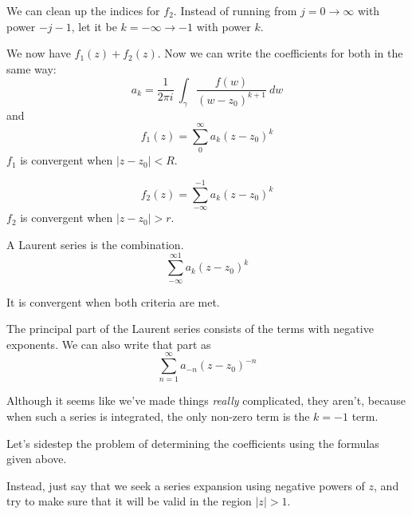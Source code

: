\documentclass[11pt, oneside]{article}
\begin{document}
We can clean up the indices for $f_2$.  Instead of running from $j = 0 \rightarrow \infty$ with power $ - j -1$, let it be $k = - \infty \rightarrow -1$ with power $k$.

We now have $f_1(z) + f_2(z)$.  Now we can write the coefficients for both in the same way:
\[ a_k = \frac{1}{2 \pi i} \ \int_{\gamma} \frac{f(w)}{(w - z_0)^{k+1}} \ dw \]
and
\[ f_1(z) = \sum_0^{\infty} a_k(z-z_0)^k \]
$f_1$ is convergent when $|z-z_0| < R$.

\[ f_2(z) = \sum_{-\infty}^{-1} a_k(z-z_0)^k \]
$f_2$ is convergent when $|z-z_0| > r$.

A Laurent series is the combination.
\[ \sum_{-\infty}^{\infty1} a_k(z-z_0)^k \]

It is convergent when both criteria are met.

The principal part of the Laurent series consists of the terms with negative exponents.  We can also write that part as
\[ \sum_{n=1}^{\infty} a_{-n} (z - z_0)^{-n} \]

Although it seems like we've made things \emph{really} complicated, they aren't, because when such a series is integrated, the only non-zero term is the $k = -1$ term.

Let's sidestep the problem of determining the coefficients using the formulas given above.

Instead, just say that we seek a series expansion using negative powers of $z$, and try to make sure that it will be valid in the region $|z| > 1$.
\end{document}
